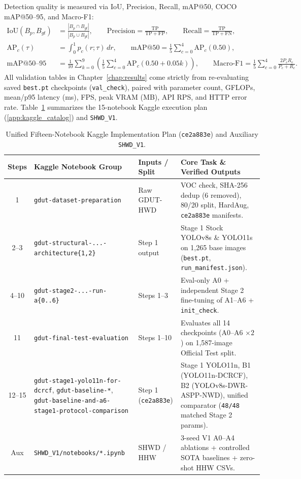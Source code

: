 Detection quality is measured via IoU, Precision, Recall, mAP@50, COCO mAP@50--95, and Macro-F1:
\begin{align}
\mathrm{IoU}(B_p, B_{gt}) &= \frac{|B_p \cap B_{gt}|}{|B_p \cup B_{gt}|}, \qquad
\mathrm{Precision} = \frac{\mathrm{TP}}{\mathrm{TP} + \mathrm{FP}}, \qquad
\mathrm{Recall} = \frac{\mathrm{TP}}{\mathrm{TP} + \mathrm{FN}}, \label{eq:ch4_pr} \\
\mathrm{AP}_c(\tau) &= \int_0^1 p_c(r; \tau)\,dr, \qquad
\mathrm{mAP@50} = \frac{1}{5} \sum_{c=0}^{4} \mathrm{AP}_c(0.50), \label{eq:ch4_map50} \\
\mathrm{mAP@50\text{--}95} &= \frac{1}{10} \sum_{k=0}^{9} \left(\frac{1}{5}\sum_{c=0}^{4} \mathrm{AP}_c(0.50 + 0.05k)\right), \qquad
\mathrm{Macro\text{-}F1} = \frac{1}{5} \sum_{c=0}^{4} \frac{2 P_c R_c}{P_c + R_c}. \label{eq:ch4_map95}
\end{align}
All validation tables in Chapter~\ref{chap:results} come strictly from re-evaluating saved \texttt{best.pt} checkpoints (\texttt{val\_check}), paired with parameter count, GFLOPs, mean/p95 latency (ms), FPS, peak VRAM (MB), API RPS, and HTTP error rate. Table~\ref{tab:ch4_impl_plan} summarizes the 15-notebook Kaggle execution plan (\ref{app:kaggle_catalog}) and \texttt{SHWD\_V1}.

\begin{table}[htbp]
\centering
\caption{Unified Fifteen-Notebook Kaggle Implementation Plan (\texttt{ce2a883e}) and Auxiliary \texttt{SHWD\_V1}.}
\label{tab:ch4_impl_plan}
\footnotesize
\renewcommand{\arraystretch}{1.12}
\begin{tabularx}{\textwidth}{|c|p{4.7cm}|p{2.6cm}|X|}
\hline
\rowcolor{slatehdr}
\textbf{Steps} & \textbf{Kaggle Notebook Group} & \textbf{Inputs / Split} & \textbf{Core Task \& Verified Outputs} \\
\hline
1 & \nolinkurl{gdut-dataset-preparation} & Raw GDUT-HWD & VOC check, SHA-256 dedup (6 removed), 80/20 split, HardAug, \texttt{ce2a883e} manifests. \\ \hline
2--3 & \nolinkurl{gdut-structural-...-architecture{1,2}} & Step 1 output & Stage 1 Stock YOLOv8s \& YOLO11s on 1,265 base images (\texttt{best.pt}, \nolinkurl{run_manifest.json}). \\ \hline
4--10 & \nolinkurl{gdut-stage2-...-run-a{0..6}} & Steps 1--3 & Eval-only A0 + independent Stage 2 fine-tuning of A1--A6 + \texttt{init\_check}. \\ \hline
11 & \nolinkurl{gdut-final-test-evaluation} & Steps 1--10 & Evaluates all 14 checkpoints (A0--A6 $\times 2$) on 1,587-image Official Test split. \\ \hline
12--15 & \nolinkurl{gdut-stage1-yolo11n-for-dcrcf}, \nolinkurl{gdut-baseline-*}, \nolinkurl{gdut-baseline-and-a6-stage1-protocol-comparison} & Step 1 (\texttt{ce2a883e}) & Stage 1 YOLO11n, B1 (YOLO11n-DCRCF), B2 (YOLOv8s-DWR-ASPP-NWD), unified comparator (\texttt{48/48} matched Stage 2 params). \\ \hline
Aux & \nolinkurl{SHWD_V1/notebooks/*.ipynb} & SHWD / HHW & 3-seed V1 A0--A4 ablations + controlled SOTA baselines + zero-shot HHW CSVs. \\ \hline
\end{tabularx}
\end{table}

